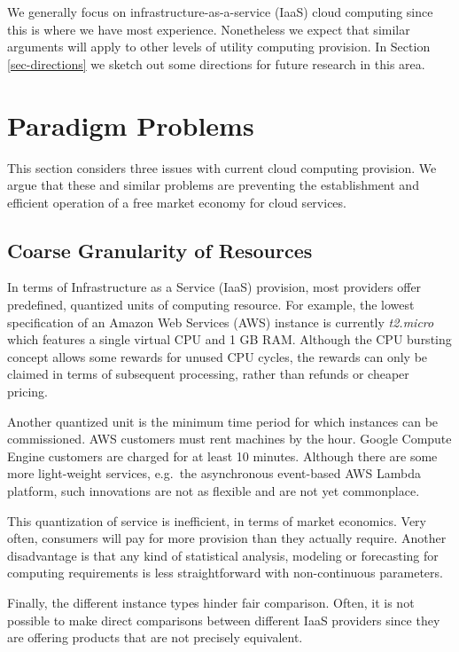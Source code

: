 \documentclass[conference,10pt]{IEEEtran}
\begin{document}
We generally focus on infrastructure-as-a-service (IaaS) cloud computing since this is where we have most experience. Nonetheless we expect that similar arguments will apply to other levels of utility computing provision.
%
In Section \ref{sec-directions} we sketch out some directions for future research in this area.


\section{Paradigm Problems}
\label{sec-probs}

This section considers three issues with current cloud computing provision.
We argue that these and similar problems are preventing the establishment and efficient operation of a free market economy for cloud services.



\subsection{Coarse Granularity of Resources}

In terms of Infrastructure as a Service (IaaS) provision, most providers offer predefined, quantized units of computing resource. For example, the lowest specification of an Amazon Web Services (AWS) instance is currently \emph{t2.micro} which features a single virtual CPU and 1 GB RAM. Although the CPU bursting concept allows some rewards for unused CPU cycles, the rewards can only be claimed in terms of subsequent processing, rather than refunds or cheaper pricing.  

Another quantized unit is the minimum time period for which instances can be commissioned. AWS customers must rent machines by the hour. Google Compute Engine customers are charged for at least 10 minutes.
Although there are some more light-weight services, e.g.\ the asynchronous event-based AWS Lambda platform, such innovations are not as flexible and are not yet commonplace.

This quantization of service is inefficient, in terms of market economics. Very often, consumers will pay for more provision than they actually require. Another disadvantage is that any kind of statistical analysis, modeling or forecasting for computing requirements is less straightforward with non-continuous parameters. 

Finally, the different instance types hinder fair comparison. Often, it is not possible to make direct comparisons between different IaaS providers since they are offering products that are not precisely equivalent.
\end{document}
